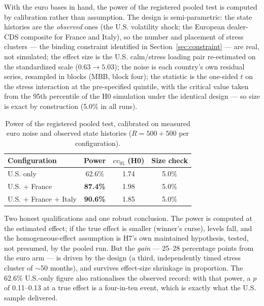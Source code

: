 \documentclass[11pt]{article}
\begin{document}
With the euro bases in hand, the power of the registered pooled test is computed by calibration rather than assumption. The design is semi-parametric: the state histories are the \emph{observed} ones (the U.S. volatility shock; the European dealer-CDS composite for France and Italy), so the number and placement of stress clusters --- the binding constraint identified in Section~\ref{sec:constraint} --- are real, not simulated; the effect size is the U.S. calm/stress loading pair re-estimated on the standardized scale ($0.63 \to 5.03$); the noise is each country's own residual series, resampled in blocks (MBB, block four); the statistic is the one-sided $t$ on the stress interaction at the pre-specified quintile, with the critical value taken from the 95th percentile of the H0 simulation under the identical design --- so size is exact by construction (5.0\% in all runs).

\begin{table}[h!]\centering\small
\begin{tabular}{lccc}
\toprule
Configuration & Power & $cv_{95}$ (H0) & Size check \\
\midrule
U.S. only & 62.6\% & 1.74 & 5.0\% \\
U.S. $+$ France & \textbf{87.4\%} & 1.98 & 5.0\% \\
U.S. $+$ France $+$ Italy & \textbf{90.6\%} & 1.85 & 5.0\% \\
\bottomrule
\end{tabular}
\caption{Power of the registered pooled test, calibrated on measured euro noise and observed state histories ($R=500+500$ per configuration).}
\label{tab:power}
\end{table}

Two honest qualifications and one robust conclusion. The power is computed at the estimated effect; if the true effect is smaller (winner's curse), levels fall, and the homogeneous-effect assumption is H7's own maintained hypothesis, tested, not presumed, by the pooled run. But the \emph{gain} --- 25--28 percentage points from the euro arm --- is driven by the design (a third, independently timed stress cluster of $\sim$50 months), and survives effect-size shrinkage in proportion. The 62.6\% U.S.-only figure also rationalises the observed record: with that power, a $p$ of 0.11--0.13 at a true effect is a four-in-ten event, which is exactly what the U.S. sample delivered.
\end{document}

